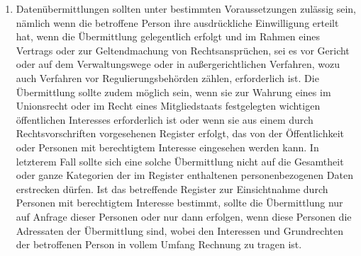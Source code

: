 \begin{enumerate}
   \item Datenübermittlungen sollten unter bestimmten Voraussetzungen zulässig sein, nämlich wenn die betroffene Person
    ihre ausdrückliche Einwilligung erteilt hat, wenn die Übermittlung gelegentlich erfolgt und im Rahmen eines
    Vertrags oder zur Geltendmachung von Rechtsansprüchen, sei es vor Gericht oder auf dem Verwaltungswege oder in
    außergerichtlichen Verfahren, wozu auch Verfahren vor Regulierungsbehörden zählen, erforderlich ist. Die
    Übermittlung sollte zudem möglich sein, wenn sie zur Wahrung eines im Unionsrecht oder im Recht eines
    Mitgliedstaats festgelegten wichtigen öffentlichen Interesses erforderlich ist oder wenn sie aus einem durch
    Rechtsvorschriften vorgesehenen Register erfolgt, das von der Öffentlichkeit oder Personen mit berechtigtem
    Interesse eingesehen werden kann. In letzterem Fall sollte sich eine solche Übermittlung nicht auf die Gesamtheit
    oder ganze Kategorien der im Register enthaltenen personenbezogenen Daten erstrecken dürfen. Ist das betreffende
    Register zur Einsichtnahme durch Personen mit berechtigtem Interesse bestimmt, sollte die Übermittlung nur auf
    Anfrage dieser Personen oder nur dann erfolgen, wenn diese Personen die Adressaten der Übermittlung sind, wobei den
    Interessen und Grundrechten der betroffenen Person in vollem Umfang Rechnung zu tragen ist.%
   \label{itm:eg-111}
   


\end{enumerate}
